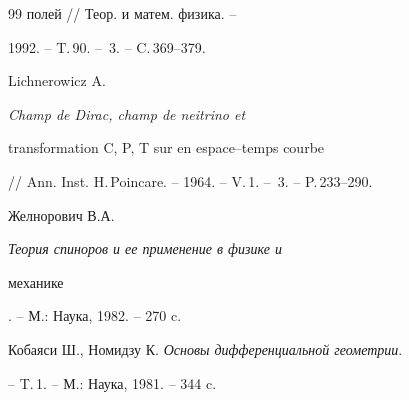 \begin{thebibliography}{99}
{полей} // Теор. и матем. физика. --


1992. -- T.\,90. -- \No\,3. -- C.\,369--379.




Lichnerowicz A. {\em Champ de Dirac, champ de neitrino et


transformation C, P, T sur en espace--temps courbe}


// Ann. Inst. H.\,Poincare. -- 1964. -- V.\,1. -- \No\,3. -- P.\,233--290.




Желнорович В.А. {\em Теория спиноров и ее применение в физике и


механике}. -- М.: Наука, 1982. -- 270 c.




Кобаяси Ш., Номидзу К. {\em Основы дифференциальной геометрии}.


-- T.\,1. -- М.: Наука, 1981. -- 344 c.





\end{thebibliography}





\vskip 2cm












\label{end}






